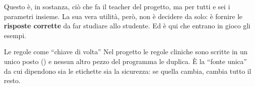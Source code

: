 Questo è, in sostanza, ciò che fa il teacher del progetto, ma per tutti e sei
i parametri insieme. La sua vera utilità, però, non è decidere da solo: è
fornire le \textbf{risposte corrette} da far studiare allo studente. Ed è qui
che entrano in gioco gli esempi.

\begin{esempio}{Le regole come ``chiave di volta''}
Nel progetto le regole cliniche sono scritte in un unico posto
() e nessun altro pezzo del programma le duplica.
È la ``fonte unica'' da cui dipendono sia le etichette sia la sicurezza: se
quella cambia, cambia tutto il resto.
\end{esempio}
